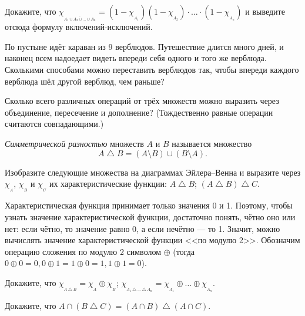\documentclass[a4paper,12pt]{article}
\newcommand{\0}[1]{\overline{#1}}
\begin{document}
Докажите, что $\chi_{{}_{\0{A_1\cup A_2\cup\ldots\cup A_n}}}=(1-\chi_{{}_{A_1}})(1-\chi_{{}_{A_2}})\cdot\ldots\cdot(1-\chi_{{}_{A_n}})$
и выведите отсюда формулу включений-исключений.


По пустыне идёт караван из 9 верблюдов. Путешествие длится много дней, и наконец всем надоедает видеть впереди себя одного и того же верблюда. Сколькими способами можно переставить верблюдов так, чтобы впереди каждого верблюда шёл другой верблюд, чем раньше?

Сколько всего различных операций от трёх множеств можно выразить
через объединение, пересечение и дополнение? (Тождественно равные
операции считаются совпадающими.)


\emph{Симметрической разностью} множеств $A$ и $B$ называется
множество
$$
A\mathop\bigtriangleup B=(A\setminus B)\cup
(B\setminus A).
$$

\vspace*{-5mm}
Изобразите следующие множества на диаграммах
Эйлера--Венна и выразите через $\chi_{{}_A}$, $\chi_{{}_B}$ и
$\chi_{{}_C}$ их характеристические функции:
 $A\mathop\bigtriangleup B$;
 $(A\mathop\bigtriangleup B)\mathop\bigtriangleup C$.


Характеристическая функция принимает только значения 0 и 1. Поэтому, чтобы узнать значение характеристической функции, достаточно понять, чётно оно или нет: если чётно, то значение равно 0, а если нечётно --- то 1. Значит, можно вычислять значение характеристической функции <<по модулю 2>>. Обозначим операцию сложения по модулю 2 символом $\oplus$ (тогда $0\oplus0=0, 0\oplus1=1\oplus0=1, 1\oplus1=0$).

Докажите, что
 $\chi_{{}_{A\mathop\bigtriangleup B}}=\chi_{{}_{A}}\oplus\chi_{{}_{B}}$;
 $\chi_{{}_{A_1\mathop\bigtriangleup\ldots\mathop\bigtriangleup A_n}}=\chi_{{}_{A_1}}\oplus\ldots\oplus\chi_{{}_{A_n}}$.

Докажите, что $A\cap (B\mathop\bigtriangleup C) = (A\cap B)\mathop\bigtriangleup(A\cap C)$.

\end{document}
